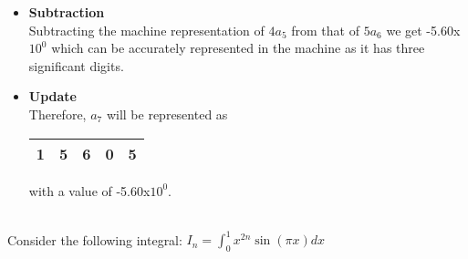 \documentclass[letterpaper]{exam}
\begin{document}
\begin{questions}
\begin{parts}
\begin{solution}
\begin{itemize}
\begin{itemize}
\item \textbf{Subtraction}\\
Subtracting the machine representation of $4a_{5}$ from that of $5a_{6}$ we get -5.60x$10^{0}$ which can be accurately represented in the machine as it has three significant digits.
\item \textbf{Update}\\
Therefore, $a_{7}$ will be represented as \begin{tabular}{|c|c|c|c|c|}
\hline
     \huge{\color{red}1}&\huge{\color{green}5}&\huge{\color{green}6}&\huge{\color{green}0}&\huge{\color{yellow}5}  \\[0.5ex]
\hline
\end{tabular} with a value of -5.60x$10^{0}$.
\end{itemize}
	\end{itemize}
	\end{solution}
\end{parts}
\\
Consider the following integral:
$\textit{I}_{n} = \int_{0}^{1}x^{2n} \sin{(\pi x) }dx$
\begin{parts}

\end{parts}
\end{questions}
\end{document}
